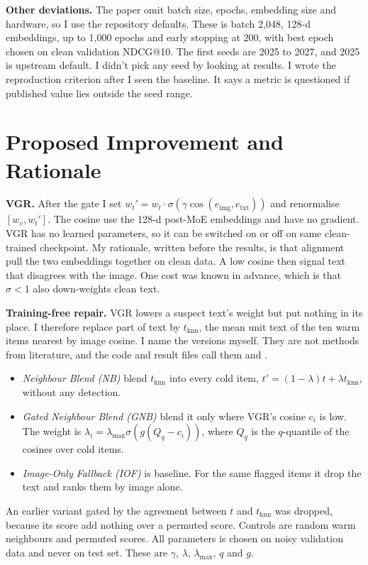 \documentclass[conference]{IEEEtran}
\newcommand{\code}[1]{\texttt{\detokenize{#1}}}
\begin{document}
\textbf{Other deviations.} The paper omit batch size, epochs, embedding size and hardware, so I use the repository defaults. These is batch 2,048, 128-d embeddings, up to 1,000 epochs and early stopping at 200, with best epoch chosen on clean validation NDCG@10. The first seeds are 2025 to 2027, and 2025 is upstream default. I didn't pick any seed by looking at results. I wrote the reproduction criterion after I seen the baseline. It says a metric is questioned if published value lies outside the seed range.

\section{Proposed Improvement and Rationale}
\label{sec:improve}

\textbf{VGR.} After the gate I set $w_t' = w_t \cdot \sigma(\gamma \cos(e_{\text{img}}, e_{\text{txt}}))$ and renormalise $[w_v, w_t']$. The cosine use the 128-d post-MoE embeddings and have no gradient. VGR has no learned parameters, so it can be switched on or off on same clean-trained checkpoint. My rationale, written before the results, is that alignment pull the two embeddings together on clean data. A low cosine then signal text that disagrees with the image. One cost was known in advance, which is that $\sigma<1$ also down-weights clean text.

\textbf{Training-free repair.} VGR lowers a suspect text's weight but put nothing in its place. I therefore replace part of text by $t_{\mathrm{knn}}$, the mean unit text of the ten warm items nearest by image cosine. I name the versions myself. They are not methods from literature, and the code and result files call them \code{m1} and \code{m3}.
\begin{itemize}
\item \emph{Neighbour Blend (NB)} blend $t_{\mathrm{knn}}$ into every cold item, $t'=(1-\lambda)t+\lambda t_{\mathrm{knn}}$, without any detection.
\item \emph{Gated Neighbour Blend (GNB)} blend it only where VGR's cosine $c_i$ is low. The weight is $\lambda_i=\lambda_{\max}\sigma(g(Q_q-c_i))$, where $Q_q$ is the $q$-quantile of the cosines over cold items.
\item \emph{Image-Only Fallback (IOF)} is baseline. For the same flagged items it drop the text and ranks them by image alone.
\end{itemize}
An earlier variant gated by the agreement between $t$ and $t_{\mathrm{knn}}$ was dropped, because its score add nothing over a permuted score. Controls are random warm neighbours and permuted scores. All parameters is chosen on noisy validation data and never on test set. These are $\gamma$, $\lambda$, $\lambda_{\max}$, $q$ and $g$.
\end{document}
